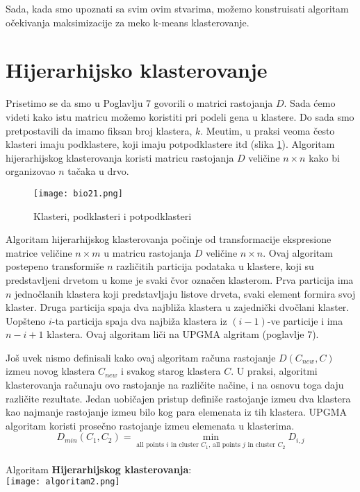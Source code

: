 Sada, kada smo upoznati sa svim ovim stvarima, možemo konstruisati algoritam očekivanja maksimizacije za meko k-means klasterovanje.

\section{Hijerarhijsko klasterovanje}

Prisetimo se da smo u Poglavlju 7 govorili o matrici rastojanja $D$. Sada ćemo videti kako istu matricu možemo koristiti pri podeli gena u klastere. Do sada smo pretpostavili da imamo fiksan broj klastera, $k$. Me\dj utim, u praksi veoma često klasteri imaju podklastere, koji imaju potpodklastere itd (slika \ref{slika 21}). Algoritam hijerarhijskog klasterovanja koristi matricu rastojanja $D$ veličine $n \times n$ kako bi organizovao $n$ tačaka u drvo. 
\begin{figure}
    \centering
    \texttt{[image: bio21.png]}
    \caption{Klasteri, podklasteri i potpodklasteri}
    \label{slika 21}
\end{figure}

Algoritam hijerarhijskog klasterovanja počinje od transformacije ekspresione matrice veličine $n \times m$ u matricu rastojanja $D$ veličine $n \times n$. Ovaj algoritam postepeno transformiše $n$ različitih particija podataka u klastere, koji su predstavljeni drvetom u kome je svaki čvor označen klasterom. Prva particija ima $n$ jednočlanih klastera koji predstavljaju listove drveta, svaki element formira svoj klaster. Druga particija spaja dva najbliža klastera u zajednički dvočlani klaster. Uopšteno $i$-ta particija spaja dva najbiža klastera iz $(i-1)$-ve particije i ima $n-i+1$ klastera. Ovaj algoritam liči na UPGMA algritam (poglavlje 7).

Još uvek nismo definisali kako ovaj algoritam računa rastojanje $D(C_{new}, C)$ izme\dj u novog klastera $C_{new}$ i svakog starog klastera $C$. U praksi, algoritmi klasterovanja računaju ovo rastojanje na različite načine, i na osnovu toga daju različite rezultate. Jedan uobičajen pristup definiše rastojanje izme\dj u dva klastera kao najmanje rastojanje izme\dj u bilo kog para elemenata iz tih klastera. UPGMA algoritam koristi prosečno rastojanje izme\dj u elemenata u klasterima.
$$
D_{min}(C_1, C_2) = \min_{\text{all points } i \text{ in cluster }C_1\text{, all points } j \text{ in cluster }C_2}D_{i,j} 
$$
\\
Algoritam \textbf{Hijerarhijskog klasterovanja}:
\\
\texttt{[image: algoritam2.png]}
\\

